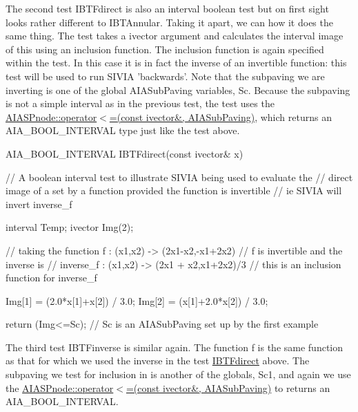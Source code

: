 \-The second test \label{AIASubPavings_IBTFdirect}%
\hypertarget{AIASubPavings_IBTFdirect}{}%
\-I\-B\-T\-Fdirect is also an interval boolean test but on first sight looks rather different to \-I\-B\-T\-Annular. \-Taking it apart, we can how it does the same thing. \-The test takes a ivector argument and calculates the interval image of this using an inclusion function. \-The inclusion function is again specified within the test. \-In this case it is in fact the inverse of an invertible function\-: this test will be used to run \-S\-I\-V\-I\-A 'backwards'. \-Note that the subpaving we are inverting is one of the \label{AIASubPavings_AIAglobal}%
\hypertarget{AIASubPavings_AIAglobal}{}%
global \-A\-I\-A\-Sub\-Paving variables, \-Sc. \-Because the subpaving is not a simple interval as in the previous test, the test uses the \hyperlink{classAIASPnode_a0869804e6aaefcc26aebe081061df6ad}{\-A\-I\-A\-S\-Pnode\-::operator$<$=(const ivector\&, A\-I\-A\-Sub\-Paving)}, which returns an \-A\-I\-A\-\_\-\-B\-O\-O\-L\-\_\-\-I\-N\-T\-E\-R\-V\-A\-L type just like the test above.


\begin{DoxyCodeInclude}
AIA_BOOL_INTERVAL IBTFdirect(const ivector& x)
{
  // A boolean interval test to illustrate SIVIA being used to evaluate the 
  // direct image of a set by a function provided the function is invertible
  // ie SIVIA will invert inverse_f

  interval Temp;
  ivector Img(2);

  // taking the function f : (x1,x2) -> (2x1-x2,-x1+2x2)
  // f is invertible and the inverse is 
  // inverse_f : (x1,x2) -> (2x1 + x2,x1+2x2)/3
  // this is an inclusion function for inverse_f

  Img[1] = (2.0*x[1]+x[2]) / 3.0;
  Img[2] = (x[1]+2.0*x[2]) / 3.0;

  return (Img<=Sc); // Sc is an AIASubPaving set up by the first example
}

\end{DoxyCodeInclude}


\-The third test \label{AIASubPavings_IBTFinverse}%
\hypertarget{AIASubPavings_IBTFinverse}{}%
\-I\-B\-T\-Finverse is similar again. \-The function f is the same function as that for which we used the inverse in the test \hyperlink{AIASubPavings_IBTFdirect}{\-I\-B\-T\-Fdirect} above. \-The subpaving we test for inclusion in is another of the globals, \-Sc1, and again we use the \hyperlink{classAIASPnode_a0869804e6aaefcc26aebe081061df6ad}{\-A\-I\-A\-S\-Pnode\-::operator$<$=(const ivector\&, A\-I\-A\-Sub\-Paving)} to returns an \-A\-I\-A\-\_\-\-B\-O\-O\-L\-\_\-\-I\-N\-T\-E\-R\-V\-A\-L.


